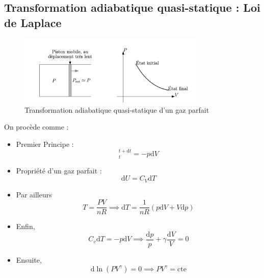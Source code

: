 \subsection{Transformation adiabatique quasi-statique : Loi de Laplace} %
\label{sub:Transformation adiabatique quasi-statique}

\begin{figure}[H] %
  \centering
  \includegraphics[width=0.8\textwidth]{./assets/Transformation adiabatique quasi-statique d'un gaz parfait.png}
  \caption{Transformation adiabatique quasi-statique d'un gaz parfait}
  \label{fig:Transformation adiabatique quasi-statique d'un gaz parfait}
\end{figure}

On procède comme :
\begin{itemize}

    \item Premier Principe : 
      \begin{equation}
        [U] _t ^{t + \mathrm{d}t} = - p \mathrm{d}V
      \end{equation}

    \item Propriété d'un gaz parfait : 
      \begin{equation}
        \mathrm{d} U = C_V \mathrm{d}T
      \end{equation}

    \item Par ailleurs 
      \begin{equation}
        T = \frac{PV}{nR}  \implies \mathrm{d}T = \frac{1}{nR} (p \mathrm{d}V + V \mathrm{d}p)
      \end{equation}

    \item Enfin, 
      \begin{equation}
        C_v \mathrm{d}T = - p \mathrm{d}V \implies \boxed{\frac{\mathrm{d}p}{p}  + \gamma \frac{\mathrm{d}V}{V} = 0}
      \end{equation}

    \item Ensuite, 
      \begin{equation}
       \mathrm{d} \ln (PV ^{\gamma}) = 0 \implies PV ^{\gamma} = \text{cte}
      \end{equation}


    
\end{itemize}

